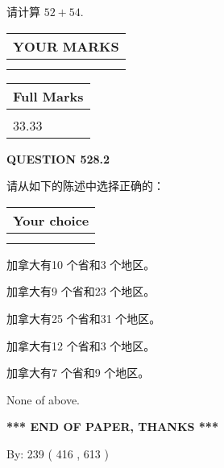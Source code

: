 \documentclass{ctexart}
\begin{document}
  
 
请计算 $ %
52 +  %
54 $.
 

 

 
  
\vspace{0.2in}
  
\noindent\begin{tabular}{|l|}
\hline
 YOUR MARKS  \\
\hline
 \\ 
 \\ 
\hline
\end{tabular}
\hspace{0.05in} \begin{tabular}{|l|}
\hline
 Full Marks  \\
\hline
 \\ 
33.33 \\
\hline
\end{tabular}
{\textbf{\Large{QUESTION
528.2 
}}}
  
  
请从如下的陈述中选择正确的：
  
  
\noindent\hspace{3.0in} \begin{tabular}{|l|}
\hline
Your choice \\
\hline
 \\ 
 \\ 
\hline
\end{tabular}
  
  
 
 
加拿大有10 个省和3 个地区。
 
 
加拿大有9 个省和23 个地区。
 
 
加拿大有25 个省和31 个地区。
 
 
加拿大有12 个省和3 个地区。
 
 
加拿大有7 个省和9 个地区。
 
 
 None of above.
 
 
   
   
 \vspace{0.2in}
 
   
   
   
   
\vspace{1.0in} 
{\textbf{\large{ *** END OF PAPER, THANKS *** }}} 
   
   
\hspace{1.0in} By: 
 239 ( 416 ,  613 )
   
\end{document}
